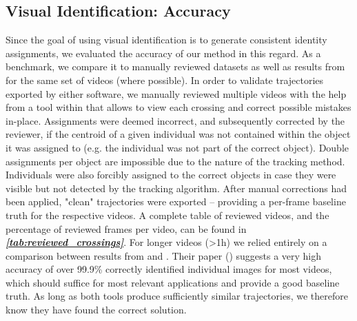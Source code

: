 \documentclass[9pt,lineno]{elife}
\newcommand{\tableref}[1]{\textit{\textbf{\ref{tab:#1}}}\xspace}
\newcommand{\idtracker}{\protect\path{ idtracker.ai}}
\newcommand{\TRex}{\protect\path{TRex}}
\begin{document}
\subsection{Visual Identification: Accuracy} \label{sec:maintaining_identities}

Since the goal of using visual identification is to generate consistent identity assignments, we evaluated the accuracy of our method in this regard. As a benchmark, we compare it to manually reviewed datasets as well as results from \idtracker{} for the same set of videos (where possible). In order to validate trajectories exported by either software, we manually reviewed multiple videos with the help from a tool within \TRex{} that allows to view each crossing and correct possible mistakes in-place. Assignments were deemed incorrect, and subsequently corrected by the reviewer, if the centroid of a given individual was not contained within the object it was assigned to (e.g. the individual was not part of the correct object). Double assignments per object are impossible due to the nature of the tracking method. Individuals were also forcibly assigned to the correct objects in case they were visible but not detected by the tracking algorithm. After manual corrections had been applied, "clean" trajectories were exported -- providing a per-frame baseline truth for the respective videos. A complete table of reviewed videos, and the percentage of reviewed frames per video, can be found in \tableref{reviewed_crossings}. For longer videos (>1h) we relied entirely on a comparison between results from \idtracker{} and \TRex{}. Their paper (\cite{idtrackerai}) suggests a very high accuracy of over 99.9\% correctly identified individual images for most videos, which should suffice for most relevant applications and provide a good baseline truth. As long as both tools produce sufficiently similar trajectories, we therefore know they have found the correct solution.
\end{document}
